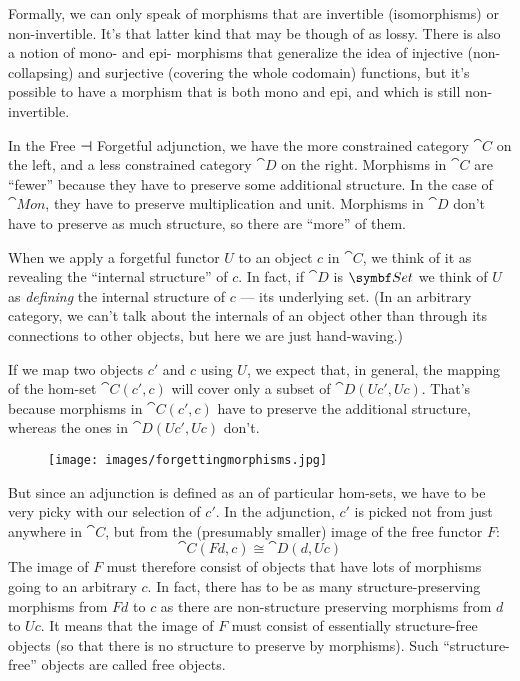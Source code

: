 Formally, we can only speak of morphisms that are invertible
(isomorphisms) or non-invertible. It's that latter kind that may be
though of as lossy. There is also a notion of mono- and epi- morphisms
that generalize the idea of injective (non-collapsing) and surjective
(covering the whole codomain) functions, but it's possible to have a
morphism that is both mono and epi, and which is still non-invertible.

In the Free ⊣ Forgetful adjunction, we have the more constrained
category $\cat{C}$ on the left, and a less constrained category $\cat{D}$
on the right. Morphisms in $\cat{C}$ are ``fewer'' because they have to
preserve some additional structure. In the case of $\cat{Mon}$, they
have to preserve multiplication and unit. Morphisms in $\cat{D}$ don't
have to preserve as much structure, so there are ``more'' of them.

When we apply a forgetful functor $U$ to an object $c$ in
$\cat{C}$, we think of it as revealing the ``internal structure'' of
$c$. In fact, if $\cat{D}$ is $\Set$ we think of $U$
as \emph{defining} the internal structure of $c$ --- its
underlying set. (In an arbitrary category, we can't talk about the
internals of an object other than through its connections to other
objects, but here we are just hand-waving.)

If we map two objects $c'$ and $c$ using $U$,
we expect that, in general, the mapping of the hom-set
$\cat{C}(c', c)$ will cover only a subset of
$\cat{D}(U c', U c)$. That's because morphisms in
$\cat{C}(c', c)$ have to preserve the additional structure,
whereas the ones in $\cat{D}(U c', U c)$ don't.

\begin{figure}[H]
\centering
\texttt{[image: images/forgettingmorphisms.jpg]}
\end{figure}

\noindent
But since an adjunction is defined as an  of
particular hom-sets, we have to be very picky with our selection of
$c'$. In the adjunction, $c'$ is picked not
from just anywhere in $\cat{C}$, but from the (presumably smaller) image
of the free functor $F$:
\[\cat{C}(F d, c) \cong \cat{D}(d, U c)\]
The image of $F$ must therefore consist of objects that have lots
of morphisms going to an arbitrary $c$. In fact, there has to be
as many structure-preserving morphisms from $F d$ to $c$
as there are non-structure preserving morphisms from $d$ to
$U c$. It means that the image of $F$ must consist of
essentially structure-free objects (so that there is no structure to
preserve by morphisms). Such ``structure-free'' objects are called free
objects.


